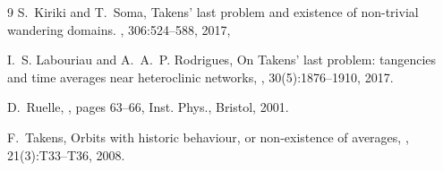 \documentclass{amsart}
\theoremstyle{plain}
\theoremstyle{definition}
\theoremstyle{remark}
\numberwithin{equation}{section}
\begin{document}
\begin{thebibliography}{9}
S.~Kiriki and T.~Soma, 
\newblock Takens' last problem and existence of non-trivial wandering domains.
, 306:524--588, 2017, 

I.~S. Labouriau and A.~A.~P. Rodrigues, 
\newblock On {T}akens' last problem: tangencies and time averages near
  heteroclinic networks, 
, 30(5):1876--1910, 2017.

D.~Ruelle, 
, pages 63--66, 
\newblock Inst. Phys., Bristol, 2001.

F.~Takens, 
\newblock Orbits with historic behaviour, or non-existence of averages, 
, 21(3):T33--T36, 2008.




\end{thebibliography}
\end{document}
